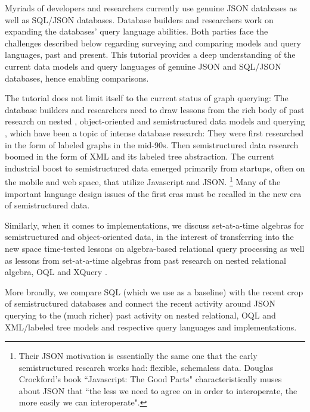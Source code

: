Myriads of developers and researchers currently use genuine JSON databases as well as SQL/JSON databases. Database builders and researchers work on expanding the databases' query language abilities. Both parties face the challenges described below regarding surveying and comparing models and query languages, past and present. This tutorial provides a deep understanding of the current data models and query languages of genuine JSON and SQL/JSON databases, hence enabling comparisons. 

The tutorial does not limit itself to the current status of graph querying: The database builders and researchers need to draw lessons from the rich body of past research on nested \cite{nest-unnest-pods-1982,nested-relational-vldb-1988,nested-relational-workshop-lncs-1989}, object-oriented \cite{oql-dbpl-1989} and semistructured data models and querying \cite{xml-ql-computer-networks-1999,xml-query-language-survey-sigmod-record-2000,xquery-3.0-w3c-2013}, which have been a topic of intense database research: They were first researched in the form of labeled graphs in the mid-90s. Then semistructured data research boomed in the form of XML and its labeled tree abstraction. The current industrial boost to semistructured data emerged primarily from startups, often on the mobile and web space, that utilize Javascript and JSON.%
\footnote{Their JSON motivation is essentially the same one that the early semistructured research works had: flexible, schemaless data. Douglas Crockford's book ``Javascript: The Good Parts" characteristically muses about JSON that ``the less we need to agree on in order to interoperate, the more easily we can interoperate".
}
Many of the important language design issues of the first eras must be recalled in the new era of semistructured data.

Similarly, when it comes to implementations, we discuss set-at-a-time algebras for semistructured and object-oriented data, in the interest of transferring into the new space time-tested lessons on algebra-based relational query processing as well as lessons from set-at-a-time algebras from past research on nested relational algebra, OQL and XQuery \cite{GTP,XAT,OQL,SAL,DanaVLDB2004,Re06,MichielsTreePattern07,IoanaFQAS06,NicoleSerge,WiscMaier,Sartiani-Algebra,TAX,Enosys,Timber,NatixVLDBJ,Rainbow}. 

More broadly, we compare SQL (which we use as a baseline) with the recent crop of semistructured databases and connect the recent activity around JSON querying to the (much richer) past activity on nested relational, OQL and XML/labeled tree models and respective query languages and implementations. 

